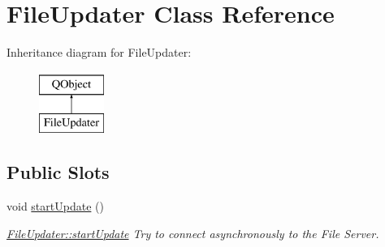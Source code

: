 \hypertarget{classFileUpdater}{}\section{File\+Updater Class Reference}
\label{classFileUpdater}
Inheritance diagram for File\+Updater\+:\begin{figure}[H]
\begin{center}
\leavevmode
\includegraphics[height=2.000000cm]{d7/d94/classFileUpdater}
\end{center}
\end{figure}
\subsection*{Public Slots}
\begin{DoxyCompactItemize}
\item 
\mbox{\label{classFileUpdater_ac48e92d85fa2018e59b80f080a6f4e66}} 
void \mbox{\hyperlink{classFileUpdater_ac48e92d85fa2018e59b80f080a6f4e66}{start\+Update}} ()
\begin{DoxyCompactList}\small\item\em \mbox{\hyperlink{classFileUpdater_ac48e92d85fa2018e59b80f080a6f4e66}{File\+Updater\+::start\+Update}} Try to connect asynchronously to the File Server. \end{DoxyCompactList}\end{DoxyCompactItemize}
